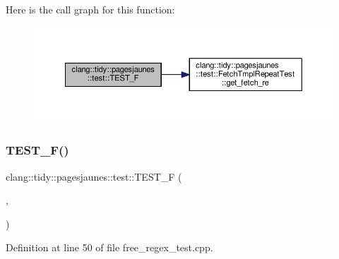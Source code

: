Here is the call graph for this function\+:
\nopagebreak
\begin{figure}[H]
\begin{center}
\leavevmode
\includegraphics[width=350pt]{namespaceclang_1_1tidy_1_1pagesjaunes_1_1test_ae224f8294c705315456c4a87a2a71a84_cgraph}
\end{center}
\end{figure}
\mbox{\label{namespaceclang_1_1tidy_1_1pagesjaunes_1_1test_a8fbe104b8e3e27f949ce5b93f523dd05}} 
\subsubsection{\texorpdfstring{T\+E\+S\+T\+\_\+\+F()}{TEST\_F()}\hspace{0.1cm}{\footnotesize\ttfamily [11/57]}}
{\footnotesize\ttfamily clang\+::tidy\+::pagesjaunes\+::test\+::\+T\+E\+S\+T\+\_\+F (\begin{DoxyParamCaption}\item[{\hyperlink{classclang_1_1tidy_1_1pagesjaunes_1_1test_1_1_free_regex_test}{Free\+Regex\+Test}}]{,  }\item[{Regex\+Matching\+Indicators}]{ }\end{DoxyParamCaption})}



Definition at line 50 of file free\+\_\+regex\+\_\+test.\+cpp.

